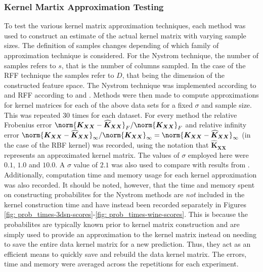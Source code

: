 \subsubsection{Kernel Martix Approximation Testing}\label{Section5.2.1}

To test the various kernel matrix approximation techniques, each method was used to construct an estimate of the actual kernel matrix with varying sample sizes. The definition of samples changes depending of which family of approximation technique is considered. For the Nystrom technique, the number of samples refers to $s$, that is the number of columns sampled. In the case of the RFF technique the samples refer to $D$, that being the dimension of the constructed feature space. The Nystrom technique was implemented according to \cite{JMLR:v6:drineas05a} and RFF according to \cite{NIPS2007_013a006f} and \cite{LiuFanghui2021RFfK}. Methods were then made to compute approximations for kernel matrices for each of the above data sets for a fixed $\sigma$ and sample size. This was repeated 30 times for each dataset. For every method the relative Frobenius error $\norm{\bm{K_{XX}} - \widehat{\bm{K}}_{\bm{XX}}}_{F} / \norm{\bm{K_{XX}}}_{F}$ and relative infinity error $\norm{\bm{K_{XX}} - \widehat{\bm{K}}_{\bm{XX}}}_{\infty} / \norm{\bm{K_{XX}}}_{\infty} = \norm{\bm{K_{XX}} - \widehat{\bm{K}}_{\bm{XX}}}_{\infty}$ (in the case of the RBF kernel) was recorded, using the notation that $\widehat{\bm{K}}_{\bm{XX}}$ represents an approximated kernel matrix. The values of $\sigma$ employed here were $0.1$, $1.0$ and $10.0$. A $\sigma$ value of $2.1$ was also used to compare with results from \cite{JMLR:v6:drineas05a}. Additionally, computation time and memory usage for each kernel approximation was also recorded. It should be noted, however, that the time and memory spent on constructing probabilites for the Nystrom methods are {\it not} included in the kernel construction time and have instead been recorded separately in Figures \ref{fig: prob_times-3dsn-scores}-\ref{fig: prob_times-wine-scores}. This is because the probabilites are typically known prior to kernel matrix construction and are simply used to provide an approximation to the kernel matrix instead on needing to save the entire data kernel matrix for a new prediction. Thus, they act as an efficient means to quickly save and rebuild the data kernel matrix. The errors, time and memory were averaged across the repetitions for each experiment.

